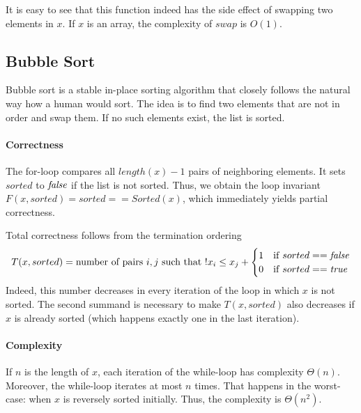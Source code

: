 \begin{acode}
\end{acode}

It is easy to see that this function indeed has the side effect of swapping two elements in $x$.
If $x$ is an array, the complexity of $swap$ is $O(1)$.


\subsection{Bubble Sort}

Bubble sort is a stable in-place sorting algorithm that closely follows the natural way how a human would sort.
The idea is to find two elements that are not in order and swap them.
If no such elements exist, the list is sorted.

\begin{acode}
\end{acode}

\paragraph{Correctness}
The for-loop compares all $length(x)-1$ pairs of neighboring elements.
It sets $sorted$ to $\mathit{false}$ if the list is not sorted.
Thus, we obtain the loop invariant $F(x,sorted)=sorted==Sorted(x)$, which immediately yields partial correctness.

Total correctness follows from the termination ordering
 \[T(x,sorted)=\text{number of pairs $i,j$ such that $! x_i\leq x_j$} + \begin{cases}1&\mathrm{if}\; sorted==\mathit{false}\\ 0&\mathrm{if}\; sorted==\mathit{true}\end{cases}\]
Indeed, this number decreases in every iteration of the loop in which $x$ is not sorted.
The second summand is necessary to make $T(x,sorted)$ also decreases if $x$ is already sorted (which happens exactly one in the last iteration).

\paragraph{Complexity}
If $n$ is the length of $x$, each iteration of the while-loop has complexity $\Theta(n)$.
Moreover, the while-loop iterates at most $n$ times.
That happens in the worst-case: when $x$ is reversely sorted initially.
Thus, the complexity is $\Theta(n^2)$.

